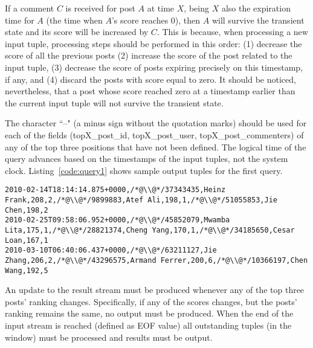 \documentclass{sig-alternate}
\begin{document}
If a comment $C$ is received for post $A$ at time $X$, being $X$ also the expiration time for $A$ (the time when $A$'s score reaches 0), then $A$ will survive the transient state and its score will be increased by $C$. This is because, when processing a new input tuple, processing steps should be performed in this order: (1) decrease the score of all the previous posts (2) increase the score of the post related to the input tuple, (3) decrease the score of posts expiring precisely on this timestamp, if any, and (4) discard the posts with score equal to zero. It should be noticed, nevertheless, that a post whose score reached zero at a timestamp earlier than the current input tuple will not survive the transient state.

The character ``--" (a minus sign without the quotation marks) should be used for each of the fields (topX\_post\_id, topX\_post\_user, topX\_post\_commenters) of any of the top three positions that have not been defined. The logical time of the query advances based on the timestamps of the input tuples, not the system clock. Listing~\ref{code:query1} shows sample output tuples for the first query.

\begin{lstlisting}[float=ht,caption={Output example for the three top scoring posts query},label={code:query1}]
2010-02-14T18:14:14.875+0000,/*@\\@*/37343435,Heinz Frank,208,2,/*@\\@*/9899883,Atef Ali,198,1,/*@\\@*/51055853,Jie Chen,198,2
2010-02-25T09:58:06.952+0000,/*@\\@*/45852079,Mwamba Lita,175,1,/*@\\@*/28821374,Cheng Yang,170,1,/*@\\@*/34185650,Cesar Loan,167,1
2010-03-10T06:40:06.437+0000,/*@\\@*/63211127,Jie Zhang,206,2,/*@\\@*/43296575,Armand Ferrer,200,6,/*@\\@*/10366197,Chen Wang,192,5
\end{lstlisting}

An update to the result stream must be produced whenever any of the top three posts' ranking changes. Specifically, if any of the scores changes, but the posts' ranking remains the same, no output must be produced. When the end of the input stream is reached (defined as EOF value) all outstanding tuples (in the window) must be processed and results must be output. 
\end{document}
